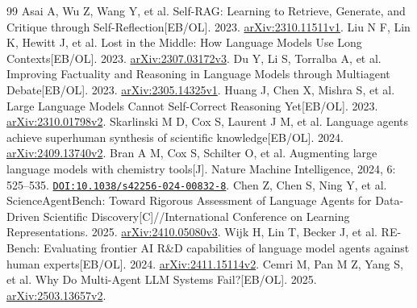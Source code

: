 \begin{thebibliography}{99}
 Asai A, Wu Z, Wang Y, et al. Self-RAG: Learning to Retrieve, Generate, and Critique through Self-Reflection[EB/OL]. 2023. \href{https://arxiv.org/abs/2310.11511v1}{arXiv:2310.11511v1}.
 Liu N F, Lin K, Hewitt J, et al. Lost in the Middle: How Language Models Use Long Contexts[EB/OL]. 2023. \href{https://arxiv.org/abs/2307.03172v3}{arXiv:2307.03172v3}.
 Du Y, Li S, Torralba A, et al. Improving Factuality and Reasoning in Language Models through Multiagent Debate[EB/OL]. 2023. \href{https://arxiv.org/abs/2305.14325v1}{arXiv:2305.14325v1}.
 Huang J, Chen X, Mishra S, et al. Large Language Models Cannot Self-Correct Reasoning Yet[EB/OL]. 2023. \href{https://arxiv.org/abs/2310.01798v2}{arXiv:2310.01798v2}.
 Skarlinski M D, Cox S, Laurent J M, et al. Language agents achieve superhuman synthesis of scientific knowledge[EB/OL]. 2024. \href{https://arxiv.org/abs/2409.13740v2}{arXiv:2409.13740v2}.
 Bran A M, Cox S, Schilter O, et al. Augmenting large language models with chemistry tools[J]. Nature Machine Intelligence, 2024, 6: 525--535. \href{https://doi.org/10.1038/s42256-024-00832-8}{\nolinkurl{DOI:10.1038/s42256-024-00832-8}}.
 Chen Z, Chen S, Ning Y, et al. ScienceAgentBench: Toward Rigorous Assessment of Language Agents for Data-Driven Scientific Discovery[C]//International Conference on Learning Representations. 2025. \href{https://arxiv.org/abs/2410.05080v3}{arXiv:2410.05080v3}.
 Wijk H, Lin T, Becker J, et al. RE-Bench: Evaluating frontier AI R\&D capabilities of language model agents against human experts[EB/OL]. 2024. \href{https://arxiv.org/abs/2411.15114v2}{arXiv:2411.15114v2}.
 Cemri M, Pan M Z, Yang S, et al. Why Do Multi-Agent LLM Systems Fail?[EB/OL]. 2025. \href{https://arxiv.org/abs/2503.13657v2}{arXiv:2503.13657v2}.
\end{thebibliography}
\endgroup
